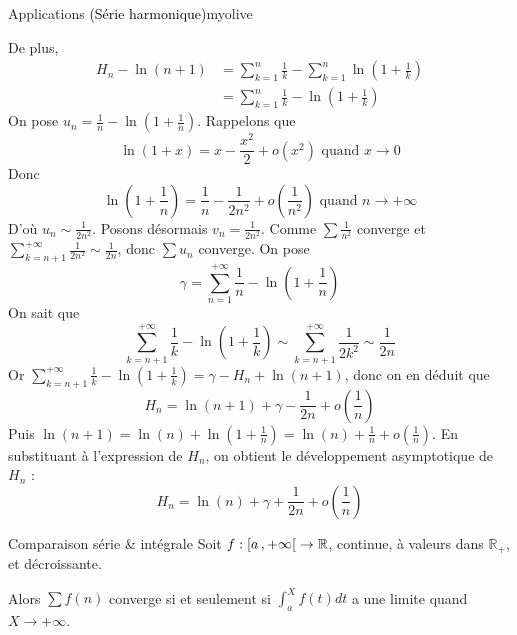 \begin{omed}{Applications \textcolor{black}{(Série harmonique)}}{myolive}
\begin{enumerate}
            De plus, 
            \begin{align*}
                H_n - \ln(n+1) &= \sum_{k=1}^{n} \frac{1}{k} - \sum_{k=1}^{n} \ln(1 + \frac{1}{k}) \\
                &= \sum_{k=1}^{n} \frac{1}{k} - \ln(1 + \frac{1}{k})
            \end{align*}
            On pose $u_n = \frac{1}{n} - \ln(1 + \frac{1}{n})$. Rappelons que 
            \[ \ln(1+x) = x - \frac{x^2}{2} + o(x^2) \text{ quand } x \rightarrow 0\] 
            Donc 
            \[ \ln(1 + \frac{1}{n}) = \frac{1}{n} - \frac{1}{2n^2} + o(\frac{1}{n^2}) \text{ quand } n \rightarrow +\infty \] 
            D’où $u_n \sim \frac{1}{2n^2}$. Posons désormais $v_n = \frac{1}{2n^2}$. Comme $\sum \frac{1}{n^2}$ converge et $\sum_{k=n+1}^{+\infty} \frac{1}{2n^2} \sim \frac{1}{2n}$, donc $\sum u_n$ converge. On pose 
            \[ \gamma = \sum_{n=1}^{+\infty} \frac{1}{n} - \ln(1 + \frac{1}{n}) \] 
            On sait que 
            \[ \sum_{k=n+1}^{+\infty} \frac{1}{k} - \ln(1 + \frac{1}{k}) \sim \sum_{k=n+1}^{+\infty} \frac{1}{2k^2} \sim \frac{1}{2n} \]
            Or $\sum_{k=n+1}^{+\infty} \frac{1}{k} - \ln(1 + \frac{1}{k}) = \gamma - H_n + \ln(n+1)$, donc on en déduit que 
            \[ H_n = \ln(n+1) + \gamma - \frac{1}{2n} + o(\frac{1}{n}) \] 
            Puis $\ln(n+1) = \ln(n) + \ln(1 + \frac{1}{n}) = \ln(n) + \frac{1}{n} + o(\frac{1}{n})$. En substituant à l’expression de $H_n$, on obtient le développement asymptotique de $H_n$ : 
            \[ H_n = \ln(n) + \gamma + \frac{1}{2n} + o(\frac{1}{n}) \] 
         \end{enumerate}
    \end{omed}

    \begin{prop}{Comparaison série \& intégrale}{}
        Soit $f : \left[ a \, , +\infty \right[ \rightarrow \mathbb{R}$, continue, à valeurs dans $\mathbb{R}_+$, et décroissante.

        Alors $\sum f(n)$ converge si et seulement si $\int_{a}^{X} f(t)dt$ a une limite quand $X \rightarrow +\infty$.
    \end{prop}

